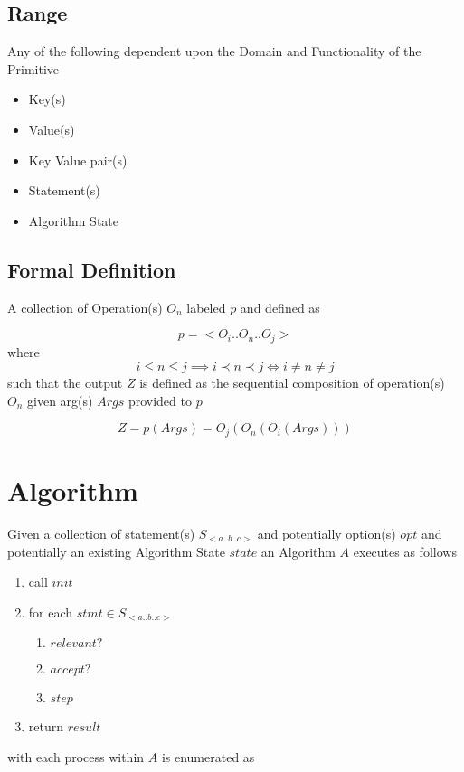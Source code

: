 \documentclass[../main.tex]{subfiles}
\begin{document}
\subsection{Range}
Any of the following dependent upon the Domain and Functionality of the Primitive

\begin{itemize}
\item Key(s)
\item Value(s)
\item Key Value pair(s)
\item Statement(s)
\item Algorithm State
\end{itemize}

\subsection{Formal Definition}

A collection of Operation(s) $O_{n}$ labeled $p$ and defined as

$$p = <O_{i}..O_{n}..O_{j}>$$
where
$$i \leq n \leq j \implies i \prec n \prec j \iff i \not= n \not= j$$
such that the output $Z$ is defined as the sequential composition of operation(s) $O_{n}$ given arg(s) $Args$ provided to $p$

$$ Z = p(Args) = O_{j}(O_{n}(O_{i}(Args))) $$

\section{Algorithm}
Given a collection of statement(s) $S_{<a..b..c>}$ and potentially option(s) $opt$ and potentially an existing Algorithm State $state$ an Algorithm $A$ executes as follows

\begin{enumerate}
\item call $init$
\item for each $stmt \in S_{<a..b..c>}$
  \begin{enumerate}
  \item $relevant?$
  \item $accept?$
  \item $step$
  \end{enumerate}
\item return $result$
\end{enumerate}
with each process within $A$ is enumerated as
\end{document}
